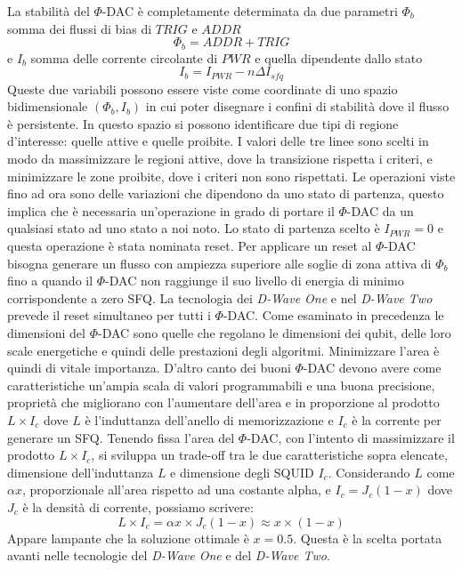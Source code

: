La stabilità del $\Phi$-DAC è completamente determinata da due parametri $\Phi_b$ somma dei flussi di bias di $TRIG$ e $ADDR$ $$\Phi_b = ADDR + TRIG$$
e $I_b$ somma delle corrente circolante di $PWR$ e quella dipendente dallo stato
$$I_b = I_{PWR} -n \Delta I_{sfq}$$
Queste due variabili possono essere viste come coordinate di uno spazio bidimensionale $(\Phi_b, I_b)$ in cui poter disegnare i confini di stabilità dove il flusso è persistente. In questo spazio si possono identificare due tipi di regione d'interesse: quelle attive e quelle proibite. I valori delle tre linee sono scelti in modo da massimizzare le regioni attive, dove la transizione rispetta i criteri, e minimizzare le zone proibite, dove i criteri non sono rispettati.
\cite{ACI}Le operazioni viste fino ad ora sono delle variazioni che dipendono da uno stato di partenza, questo implica che è necessaria un'operazione in grado di portare il $\Phi$-DAC da un qualsiasi stato ad uno stato a noi noto. Lo stato di partenza scelto è $I_{PWR} = 0$ e questa operazione è stata nominata reset. Per applicare un reset al $\Phi$-DAC bisogna generare un flusso con ampiezza superiore alle soglie di zona attiva di $\Phi_b$ fino a quando il $\Phi$-DAC non raggiunge il suo livello di energia di minimo corrispondente a zero SFQ. La tecnologia dei \textit{D-Wave One} e nel \textit{D-Wave Two} prevede il reset simultaneo per tutti i $\Phi$-DAC.
Come esaminato in precedenza le dimensioni del $\Phi$-DAC sono quelle che regolano le dimensioni dei qubit, delle loro scale energetiche e quindi delle prestazioni degli algoritmi. Minimizzare l'area è quindi di vitale importanza. D'altro canto dei buoni $\Phi$-DAC devono avere come caratteristiche un'ampia scala di valori programmabili e una buona precisione, proprietà che migliorano con l'aumentare dell'area e in proporzione al prodotto $L \times I_c$ dove $L$ è l'induttanza dell'anello di memorizzazione e $I_c$ è la corrente per generare un SFQ. Tenendo fissa l'area del $\Phi$-DAC, con l'intento di massimizzare il prodotto $L \times I_c$, si sviluppa un trade-off tra le due caratteristiche sopra elencate, dimensione dell'induttanza $L$ e dimensione degli SQUID $I_c$. Considerando $L$ come $\alpha x$, proporzionale all'area rispetto ad una costante alpha, e $I_c = J_c (1-x)$ dove $J_c$ è la densità di corrente, possiamo scrivere:
$$ L \times I_c = \alpha x \times J_c (1-x) \approx x \times (1 - x)$$
Appare lampante che la soluzione ottimale è $x = 0.5$. Questa è la scelta portata avanti nelle tecnologie del \textit{D-Wave One} e del \textit{D-Wave Two}.

